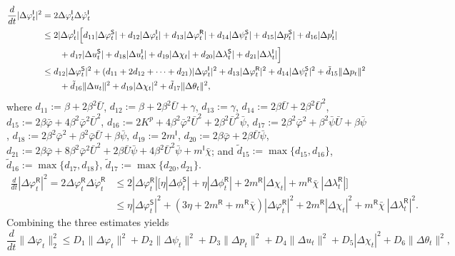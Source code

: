 \documentclass[letterpaper, 10 pt, conference]{ieeeconf}  %
\def\sS{\mathsf{S}}
\def\sI{\mathsf{I}}
\def\sR{\mathsf{R}}
\begin{document}
$$
\begin{aligned}
\frac{d}{dt} |\Delta \varphi_t^{\sI}|^2
&= 2\Delta \varphi_t^{\sI}\Delta \dot \varphi_t^{\sI} \\
&\leq 2|\Delta \varphi_t^{\sI}|
\Bigl[
d_{11} |\Delta \varphi_t^{\sS}| + d_{12} |\Delta \varphi_t^{\sI}| + d_{13} |\Delta \varphi_t^{\sR}| + d_{14} |\Delta \psi_t^{\sS}| + d_{15}|\Delta p_t^\sS| + d_{16}|\Delta p_t^\sI| \\ &\quad\quad  +d_{17}|\Delta u_t^\sS| + d_{18}|\Delta u_t^\sI| + d_{19}|\Delta \chi_t| + d_{20}|\Delta \lambda_t^\sS| + d_{21}|\Delta \lambda_t^\sI|
\Bigr] \\
&\leq d_{12}|\Delta \varphi_t^{\sS}|^2 + (d_{11}+2d_{12}+\cdots+d_{21})|\Delta \varphi_t^{\sI}|^2 + d_{13}|\Delta \varphi_t^{\sR}|^2 + d_{14}|\Delta \psi_t^{\sS}|^2 + \tilde{d}_{15}\|\Delta p_t\|^2 \\ & \quad \quad + \tilde{d}_{16}\|\Delta u_t\|^2 + d_{19}|\Delta \chi_t|^2 + \tilde{d}_{17}\|\Delta \theta_t\|^2,
\end{aligned}
$$
where $d_{11}:=\beta + 2\beta^2\bar{U}$, $d_{12}:=\beta + 2\beta^2\bar{U}+\gamma$, $d_{13} := \gamma$, $d_{14}:=2\beta\bar{U}+2\beta^2\bar{U}^2$, $d_{15}:=2\beta\bar{\varphi}+4\beta^2 \bar{\varphi}^2 \bar{U}^2$, $d_{16}:=2K^p + 4\beta^2\bar{\varphi}^2\bar{U}^2+2\beta^2\bar{U}^2\bar{\psi}$, $d_{17}:=2\beta^2\bar{\varphi}^2+\beta^2\bar{\psi}\bar{U}+\beta \bar{\psi}$, $d_{18}:=2\beta^2\bar{\varphi}^2+\beta^2\bar{\varphi}\bar{U}+\beta \bar{\psi}$, $d_{19}:=2m^\sI$, $d_{20}:=2\beta \bar{\varphi}+2\beta \bar{U}\bar{\psi}$, $d_{21}:=2 \beta \bar{\varphi}+8 \beta^2 \bar{\varphi}^2 \bar{U}^2+2 \beta \bar{U} \bar{\psi}+4 \beta^2 \bar{U}^2 \bar{\psi}+m^\sI \bar{\chi}$; and $\tilde{d}_{15}:=\max\{d_{15}, d_{16}\}$, $\tilde{d}_{16}:=\max\{d_{17}, d_{18}\}$, $\tilde{d}_{17}:=\max\{d_{20}, d_{21}\}$.
$$
\begin{aligned}
\frac{d}{dt} |\Delta \varphi_t^{\sR}|^2
= 2\Delta \varphi_t^{\sR}\Delta \dot \varphi_t^{\sR} &\leq 2|\Delta \varphi_t^{\sR}|
\big[
\eta |\Delta \phi_t^{\sS}| + \eta |\Delta \phi_t^{\sR}| + 2 m^\sR|\Delta \chi_t| + m^\sR \bar{\chi}\ |\Delta \lambda_t^\sR|
\big] \\
&\le \eta |\Delta \varphi_t^{\sS}|^2 + (3\eta + 2 m^\sR + m^\sR \bar{\chi})|\Delta \varphi_t^{\sR}|^2 + 2 m^\sR|\Delta \chi_t|^2 + m^\sR \bar{\chi}\ |\Delta \lambda_t^\sR|^2.
\end{aligned}
$$
Combining the three estimates yields
$$
\frac{d}{dt}\|\Delta \varphi_t\|_2^2 \leq D_1\|\Delta \varphi_t\|^2 + D_2\|\Delta \psi_t\|^2 + D_3\|\Delta p_t\|^2 + D_4\|\Delta u_t\|^2 + D_5|\Delta \chi_t|^2 + D_6\|\Delta \theta_t\|^2,
$$
\end{document}
